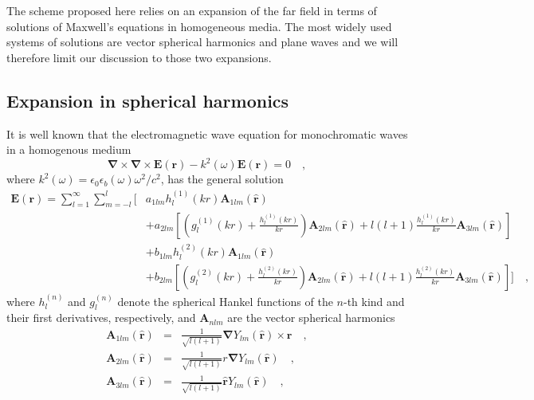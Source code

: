 \documentclass[10pt,letterpaper]{article}
\renewcommand{\vec}[1]{\mathbf{#1}}
\let\oldhat\hat
\renewcommand{\hat}[1]{\oldhat{\vec{#1}}}
\begin{document}
The scheme proposed here relies on an expansion of the far field in terms of solutions of Maxwell's equations in homogeneous media. The most widely used systems of solutions are vector spherical harmonics and plane waves and we will therefore limit our discussion to those two expansions.

\subsection{Expansion in spherical harmonics}
\label{sec:spherical_harmonics}

It is well known that the electromagnetic wave equation for monochromatic waves in a homogenous medium
\begin{equation}
\vec{\nabla}\times\vec{\nabla}\times\vec{E}\left(\vec{r}\right) - k^2(\omega)\vec{E}\left(\vec{r}\right) = 0 \quad , \label{eq:wave_equation}
\end{equation}
where $k^2(\omega) = \epsilon_0\epsilon_b(\omega)\omega^2/c^2$, has the general solution \cite{Bohren1998, Kristensson2016}
\begin{align}
\vec{E}\left(\vec{r}\right)  = \sum_{l=1}^\infty\sum_{m=-l}^l \Biggl[ &
a_{1lm}h_l^{(1)}\left(kr\right)\vec{A}_{1lm}\left(\hat{r}\right) \nonumber\\ & +
a_{2lm}\left[\left(g_l^{(1)}\left(kr\right) + \frac{h_l^{(1)}\left(kr\right)}{kr}\right)\vec{A}_{2lm}\left(\hat{r}\right) + l(l+1) \frac{h_l^{(1)}\left(kr\right)}{kr}\vec{A}_{3lm}\left(\hat{r}\right)\right] \nonumber\\ & +
b_{1lm}h_l^{(2)}\left(kr\right)\vec{A}_{1lm}\left(\hat{r}\right) \nonumber\\ & +
b_{2lm}\left[\left(g_l^{(2)}\left(kr\right) + \frac{h_l^{(2)}\left(kr\right)}{kr}\right)\vec{A}_{2lm}\left(\hat{r}\right) + l(l+1) \frac{h_l^{(2)}\left(kr\right)}{kr}\vec{A}_{3lm}\left(\hat{r}\right)\right] \Biggr] \quad , \label{eq:spherical_harmonics_solution}
\end{align}
where $h_l^{(n)}$ and $g_l^{(n)}$ denote the spherical Hankel functions of the $n$-th kind and their first derivatives, respectively, and $\vec{A}_{nlm}$ are the vector spherical harmonics
\begin{eqnarray}
\vec{A}_{1lm}\left(\hat{r}\right) & = & \frac{1}{\sqrt{l(l+1)}}\vec{\nabla}Y_{lm}\left(\hat{r}\right)\times\vec{r} \quad , \nonumber \label{eq:spherical_harmonics1} \\
\vec{A}_{2lm}\left(\hat{r}\right) & = & \frac{1}{\sqrt{l(l+1)}}r\vec{\nabla}Y_{lm}\left(\hat{r}\right) \quad , \nonumber \label{eq:spherical_harmonics2} \\
\vec{A}_{3lm}\left(\hat{r}\right) & = & \frac{1}{\sqrt{l(l+1)}}\hat{r}Y_{lm}\left(\hat{r}\right) \quad , \label{eq:spherical_harmonics3}
\end{eqnarray}
\end{document}
